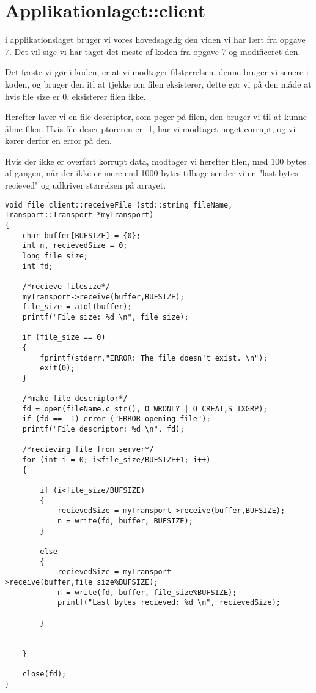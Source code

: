 \graphicspath{{Chapters/Veroboardmontering/}}

\chapter{Applikationlaget::client}

i applikationslaget bruger vi vores hovedsagelig den viden vi har lært fra opgave 7. Det vil sige vi har taget det meste af koden fra opgave 7 og modificeret den. 

Det første vi gør i koden, er at vi modtager filstørrelsen, denne bruger vi senere i koden, og bruger den itl at tjekke om filen eksisterer, dette gør vi på den måde at hvis file size er 0, eksisterer filen ikke. 

Herefter laver vi en file descriptor, som peger på filen, den bruger vi til at kunne åbne filen. Hvis file descriptoreren er -1, har vi modtaget noget corrupt, og vi kører derfor en error på den. 

Hvis der ikke er overført korrupt data, modtager vi herefter filen, med 100 bytes af gangen, når der ikke er mere end 1000 bytes tilbage sender vi en "last bytes recieved" og udkriver størrelsen på arrayet. 

\begin{lstlisting}[frame=single]  % Start your code-block
void file_client::receiveFile (std::string fileName, Transport::Transport *myTransport)
{
    char buffer[BUFSIZE] = {0};
    int n, recievedSize = 0;
    long file_size;
    int fd;

    /*recieve filesize*/
    myTransport->receive(buffer,BUFSIZE);
    file_size = atol(buffer);
    printf("File size: %d \n", file_size);

    if (file_size == 0)
    {
        fprintf(stderr,"ERROR: The file doesn't exist. \n");
        exit(0);
    }

    /*make file descriptor*/
    fd = open(fileName.c_str(), O_WRONLY | O_CREAT,S_IXGRP);
    if (fd == -1) error ("ERROR opening file");
    printf("File descriptor: %d \n", fd);

    /*recieving file from server*/
    for (int i = 0; i<file_size/BUFSIZE+1; i++)
    {

        if (i<file_size/BUFSIZE) 
        {
            recievedSize = myTransport->receive(buffer,BUFSIZE);
            n = write(fd, buffer, BUFSIZE); 
        }

        else
        {
            recievedSize = myTransport->receive(buffer,file_size%BUFSIZE);
            n = write(fd, buffer, file_size%BUFSIZE); 
            printf("Last bytes recieved: %d \n", recievedSize);

        }


    }

    close(fd);
}
\end{lstlisting}	